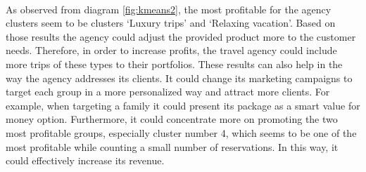 \\
As observed from diagram \ref{fig:kmeans2}, the most profitable for the agency clusters seem to be clusters `Luxury trips' and `Relaxing vacation'. Based on those results the agency could adjust the provided product more to the customer needs. Therefore, in order to increase profits, the travel agency could include more trips of these types to their portfolios. These results can also help in the way the agency addresses its clients. It could change its marketing campaigns to target each group in a more personalized way and attract more clients. For example, when targeting a family it could present its package as a smart value for money option. Furthermore, it could concentrate more on promoting the two most profitable groups, especially cluster number 4, which seems to be one of the most profitable while counting a small number of reservations. In this way, it could effectively increase its revenue.
